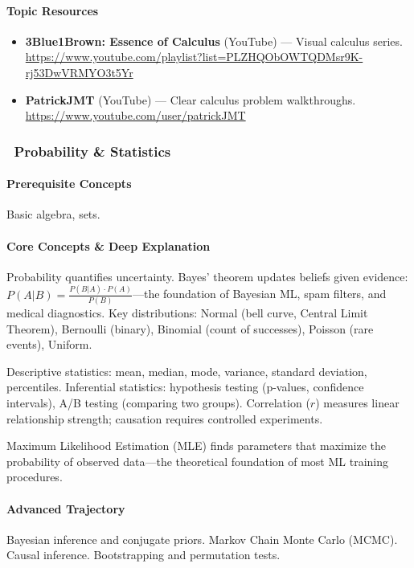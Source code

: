 \documentclass[11pt, a4paper, oneside]{report}
\newcommand{\mustmaster}[1]{\subsubsection{\texorpdfstring{\fcolorbox{blue!40!black}{blue!8}{\footnotesize\bfseries\color{blue!40!black} MUST MASTER}~#1}{#1}}}
\begin{document}
\paragraph{Topic Resources}
\begin{itemize}[leftmargin=*]
\item \textbf{3Blue1Brown: Essence of Calculus} (YouTube) --- Visual calculus series. \url{https://www.youtube.com/playlist?list=PLZHQObOWTQDMsr9K-rj53DwVRMYO3t5Yr}
\item \textbf{PatrickJMT} (YouTube) --- Clear calculus problem walkthroughs. \url{https://www.youtube.com/user/patrickJMT}
\end{itemize}

\mustmaster{Probability \& Statistics}

\paragraph{Prerequisite Concepts} Basic algebra, sets.

\paragraph{Core Concepts \& Deep Explanation} Probability quantifies uncertainty. Bayes' theorem updates beliefs given evidence: $P(A|B) = \frac{P(B|A) \cdot P(A)}{P(B)}$---the foundation of Bayesian ML, spam filters, and medical diagnostics. Key distributions: Normal (bell curve, Central Limit Theorem), Bernoulli (binary), Binomial (count of successes), Poisson (rare events), Uniform.

Descriptive statistics: mean, median, mode, variance, standard deviation, percentiles. Inferential statistics: hypothesis testing (p-values, confidence intervals), A/B testing (comparing two groups). Correlation ($r$) measures linear relationship strength; causation requires controlled experiments.

Maximum Likelihood Estimation (MLE) finds parameters that maximize the probability of observed data---the theoretical foundation of most ML training procedures.

\paragraph{Advanced Trajectory} Bayesian inference and conjugate priors. Markov Chain Monte Carlo (MCMC). Causal inference. Bootstrapping and permutation tests.
\end{document}
